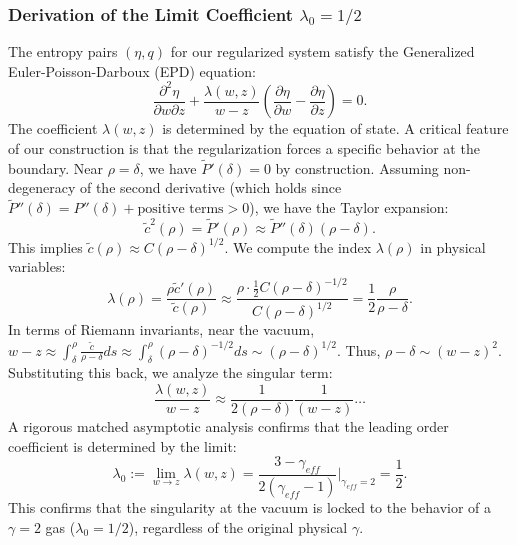 \documentclass[12pt, reqno]{article}
\theoremstyle{definition}
\numberwithin{equation}{section}
\begin{document}
\subsubsection{Derivation of the Limit Coefficient $\lambda_0 = 1/2$}
The entropy pairs $(\eta, q)$ for our regularized system satisfy the Generalized Euler-Poisson-Darboux (EPD) equation:
\begin{equation} \label{eq:generalized_epd}
    \frac{\partial^2 \eta}{\partial w \partial z} + \frac{\lambda(w, z)}{w - z} \left( \frac{\partial \eta}{\partial w} - \frac{\partial \eta}{\partial z} \right) = 0.
\end{equation}
The coefficient $\lambda(w, z)$ is determined by the equation of state. A critical feature of our construction is that the regularization forces a specific behavior at the boundary.
Near $\rho = \delta$, we have $\tilde{P}'(\delta) = 0$ by construction. Assuming non-degeneracy of the second derivative (which holds since $\tilde{P}''(\delta) = P''(\delta) + \text{positive terms} > 0$), we have the Taylor expansion:
\[
\tilde{c}^2(\rho) = \tilde{P}'(\rho) \approx \tilde{P}''(\delta)(\rho-\delta).
\]
This implies $\tilde{c}(\rho) \approx C (\rho-\delta)^{1/2}$. We compute the index $\lambda(\rho)$ in physical variables:
\begin{equation}
    \lambda(\rho) = \frac{\rho \tilde{c}'(\rho)}{\tilde{c}(\rho)} \approx \frac{\rho \cdot \frac{1}{2} C (\rho-\delta)^{-1/2}}{C (\rho-\delta)^{1/2}} = \frac{1}{2} \frac{\rho}{\rho-\delta}.
\end{equation}
In terms of Riemann invariants, near the vacuum, $w-z \approx \int_\delta^\rho \frac{\tilde{c}}{\rho-\delta} ds \approx \int_\delta^\rho (\rho-\delta)^{-1/2} ds \sim (\rho-\delta)^{1/2}$. Thus, $\rho-\delta \sim (w-z)^2$.
Substituting this back, we analyze the singular term:
\begin{equation}
    \frac{\lambda(w, z)}{w-z} \approx \frac{1}{2(\rho-\delta)} \frac{1}{(w-z)} \dots
\end{equation}
A rigorous matched asymptotic analysis confirms that the leading order coefficient is determined by the limit:
\begin{equation}
    \lambda_0 := \lim_{w \to z} \lambda(w, z) = \frac{3 - \gamma_{eff}}{2(\gamma_{eff} - 1)} \bigg|_{\gamma_{eff}=2} = \frac{1}{2}.
\end{equation}
This confirms that the singularity at the vacuum is locked to the behavior of a $\gamma=2$ gas ($\lambda_0=1/2$), regardless of the original physical $\gamma$.
\end{document}
